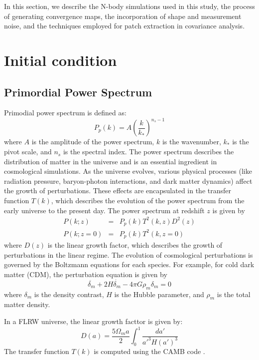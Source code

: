 In this section, we describe the N-body simulations used in this study, the process of generating convergence maps, the incorporation of shape and measurement noise, and the techniques employed for patch extraction in covariance analysis.

\section{Initial condition}
\subsection{Primordial Power Spectrum}
Primodial power spectrum is defined as:
\begin{equation}
    P_p(k) = A \left(\frac{k}{k_*}\right)^{n_s - 1}
\end{equation}
where $A$ is the amplitude of the power spectrum, $k$ is the wavenumber, $k_*$ is the pivot scale, and $n_s$ is the spectral index. The power spectrum describes the distribution of matter in the universe and is an essential ingredient in cosmological simulations.
As the universe evolves, various physical processes (like radiation pressure, baryon-photon interactions, and dark matter dynamics) affect the growth of perturbations. These effects are encapsulated in the transfer function $T(k)$, which describes the evolution of the power spectrum from the early universe to the present day. The power spectrum at redshift $z$ is given by
\begin{eqnarray}
    P(k; z) &=& P_p(k) T^2(k, z) D^2(z)  \\
    P(k; z = 0)&=& P_p(k) T^2(k, z=0) 
\end{eqnarray}
where $D(z)$ is the linear growth factor, which describes the growth of perturbations in the linear regime. 
The evolution of cosmological perturbations is governed by the Boltzmann equations for each species. For example, for cold dark matter (CDM), the perturbation equation is given by
\begin{equation}
    \ddot{\delta_m} + 2H\dot{\delta_m} - 4\pi G \rho_m \delta_m = 0
\end{equation}
where $\delta_m$ is the density contrast, $H$ is the Hubble parameter, and $\rho_m$ is the total matter density. 

In a FLRW universe, the linear growth facttor is given by:
\begin{equation}
    D(a) = \frac{5 \Omega_m a}{2} \int_0^1 \frac{da'}{a'^3 H(a')^3}
\end{equation}
The transfer function $T(k)$ is computed using the CAMB code \citep{2000ApJ...538..473L}.

